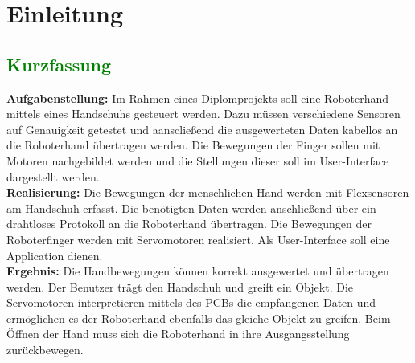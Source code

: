 \documentclass[11pt]{article}
\begin{document}

\tableofcontents


\pagebreak

\section{Einleitung}

\subsection{\textcolor{green}{Kurzfassung}}
\textbf{Aufgabenstellung:} 
Im Rahmen eines Diplomprojekts soll eine Roboterhand mittels eines Handschuhs gesteuert werden. 
Dazu müssen verschiedene Sensoren auf Genauigkeit getestet und aanscließend die ausgewerteten Daten kabellos an die
Roboterhand übertragen werden. Die Bewegungen der Finger sollen mit Motoren nachgebildet werden und die Stellungen
dieser soll im User-Interface dargestellt werden. \\
\textbf{Realisierung:} 
Die Bewegungen der menschlichen Hand werden mit Flexsensoren am Handschuh erfasst. Die benötigten Daten werden
anschließend über ein drahtloses Protokoll an die Roboterhand übertragen. Die Bewegungen der Roboterfinger werden mit
Servomotoren realisiert. Als User-Interface soll eine Application dienen. \\
\textbf{Ergebnis:} 
Die Handbewegungen können korrekt ausgewertet und übertragen werden. Der Benutzer trägt den Handschuh und greift 
ein Objekt. Die Servomotoren interpretieren mittels des PCBs die empfangenen Daten und ermöglichen es der Roboterhand 
ebenfalls das gleiche Objekt zu greifen. Beim Öffnen der Hand muss sich die Roboterhand in ihre Ausgangsstellung 
zurückbewegen.
\end{document}
